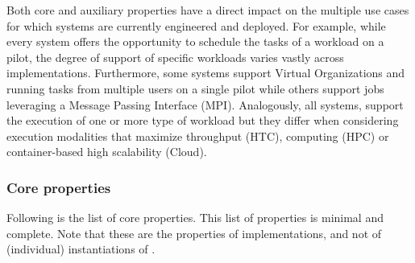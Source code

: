 \documentclass{sig-alternate}
\begin{document}
Both core and auxiliary properties have a direct impact on the multiple use
cases for which \pilot systems are currently engineered and deployed. For
example, while every \pilot system offers the opportunity to schedule the
tasks of a workload on a pilot, the degree of support of specific workloads
varies vastly across implementations. Furthermore, some \pilot systems
support Virtual Organizations and running tasks from multiple users on a single
pilot while others support jobs leveraging a Message Passing Interface (MPI).
Analogously, all \pilot systems, support the execution of one or more type
of workload but they differ when considering execution modalities that maximize
throughput (HTC), computing (HPC) or container-based high scalability (Cloud).

\subsubsection{Core properties}

Following is the list of core properties. This list of properties is minimal
and complete. Note that these are the properties of \pilot implementations, and
not of (individual) instantiations of \pilots.
\end{document}
